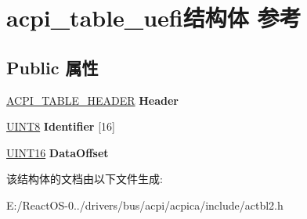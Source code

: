 \hypertarget{structacpi__table__uefi}{}\section{acpi\+\_\+table\+\_\+uefi结构体 参考}
\label{structacpi__table__uefi}
\subsection*{Public 属性}
\begin{DoxyCompactItemize}
\item 
\mbox{\label{structacpi__table__uefi_a0c4178f7f7567d93137e09a4882e0e40}} 
\hyperlink{structacpi__table__header}{A\+C\+P\+I\+\_\+\+T\+A\+B\+L\+E\+\_\+\+H\+E\+A\+D\+ER} {\bfseries Header}
\item 
\mbox{\label{structacpi__table__uefi_a197f69ea787b4c7ddeefb4446c625585}} 
\hyperlink{_processor_bind_8h_ab27e9918b538ce9d8ca692479b375b6a}{U\+I\+N\+T8} {\bfseries Identifier} \mbox{[}16\mbox{]}
\item 
\mbox{\label{structacpi__table__uefi_a58bbaf0340cde041f51678cfcc1850f8}} 
\hyperlink{_processor_bind_8h_a09f1a1fb2293e33483cc8d44aefb1eb1}{U\+I\+N\+T16} {\bfseries Data\+Offset}
\end{DoxyCompactItemize}


该结构体的文档由以下文件生成\+:\begin{DoxyCompactItemize}
\item 
E\+:/\+React\+O\+S-\/0../drivers/bus/acpi/acpica/include/actbl2.\+h\end{DoxyCompactItemize}
